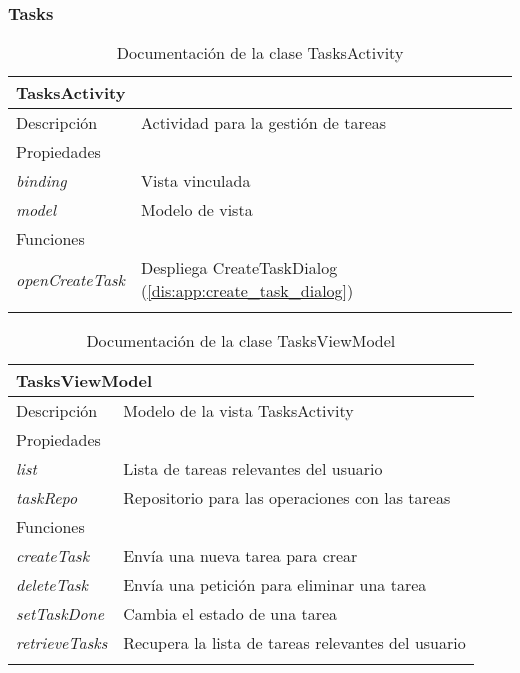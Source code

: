 \subsubsection{Tasks}

\begin{longtable}{|p{} p{}|}
    \hline
    \multicolumn{2}{|l|}{\textbf{TasksActivity}} \\ \hline \hline
    Descripción      & Actividad para la gestión de tareas \\ \hline
    \multicolumn{2}{|l|}{Propiedades} \\
    \emph{binding}  & Vista vinculada  \\
    \emph{model}  & Modelo de vista  \\ \hline
    \multicolumn{2}{|l|}{Funciones} \\
    \emph{openCreateTask}  & Despliega CreateTaskDialog (\ref{dis:app:create_task_dialog})  \\ \hline
    \caption{Documentación de la clase TasksActivity}
    \label{dis:app:tasks_activity}
\end{longtable}

\begin{longtable}{|p{} p{}|}
    \hline
    \multicolumn{2}{|l|}{\textbf{TasksViewModel}} \\ \hline \hline
    Descripción      & Modelo de la vista TasksActivity \\ \hline
    \multicolumn{2}{|l|}{Propiedades} \\
    \emph{list}  & Lista de tareas relevantes del usuario  \\
    \emph{taskRepo}  & Repositorio para las operaciones con las tareas  \\ \hline
    \multicolumn{2}{|l|}{Funciones} \\
    \emph{createTask}  & Envía una nueva tarea para crear \\
    \emph{deleteTask}  & Envía una petición para eliminar una tarea \\
    \emph{setTaskDone}  & Cambia el estado de una tarea \\
    \emph{retrieveTasks}  & Recupera la lista de tareas relevantes del usuario \\ \hline
    \caption{Documentación de la clase TasksViewModel}
    \label{dis:app:tasks_view_model}
\end{longtable}

